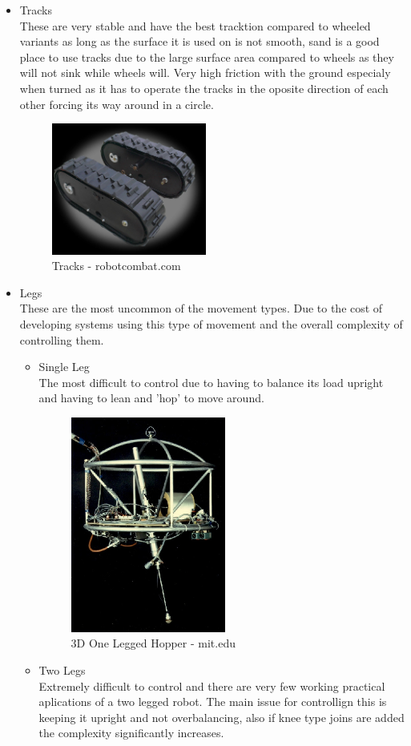 \begin{itemize}
\item Tracks
\\These are very stable and have the best tracktion compared to wheeled variants as long as the surface it is used on is not smooth, sand is a good place to use tracks due to the large surface area compared to wheels as they will not sink while wheels will.  Very high friction with the ground especialy when turned as it has to operate the tracks in the oposite direction of each other forcing its way around in a circle.
\begin{figure}[h]
\centering
        \includegraphics[width=2.0in] {Images/wheel-track.jpg}
        \caption{Tracks - robotcombat.com}
        \label{Tracks}
\end{figure}


\item Legs
\\These are the most uncommon of the movement types.  Due to the cost of developing systems using this type of movement and the overall complexity of controlling them.
	\begin{itemize}
	\item Single Leg
	\\The most difficult to control due to having to balance its load upright and having to lean and 'hop' to move around.
\begin{figure}[h]
\centering
        \includegraphics[width=2.0in] {Images/3d-hopper.jpeg}
        \caption{3D One Legged Hopper - mit.edu}
        \label{3D One Legged Hopper}
\end{figure}
	\item Two Legs
	\\Extremely difficult to control and there are very few working practical aplications of a two legged robot.  The main issue for controllign this is keeping it upright and not overbalancing, also if knee type joins are added the complexity significantly increases.


\end{itemize}
\end{itemize}
